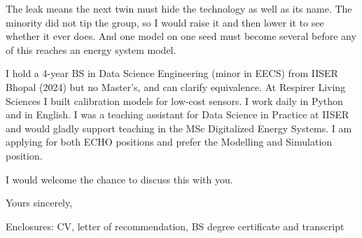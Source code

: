 \documentclass[11pt]{article}
\newcommand{\preference}{the Modelling and Simulation position}
\begin{document}
The leak means the next twin must hide the technology as well as its name. The minority did not tip the group, so I would raise it and then lower it to see whether it ever does. And one model on one seed must become several before any of this reaches an energy system model.

I hold a 4-year BS in Data Science Engineering (minor in EECS) from IISER Bhopal (2024) but no Master's, and can clarify equivalence. At Respirer Living Sciences I built calibration models for low-cost sensors. I work daily in Python and in English. I was a teaching assistant for Data Science in Practice at IISER and would gladly support teaching in the MSc Digitalized Energy Systems. I am applying for both ECHO positions and prefer \preference.

I would welcome the chance to discuss this with you.

Yours sincerely,\\[0.3em]
\myname

{\small\color{soft}Enclosures: CV, letter of recommendation, BS degree certificate and transcript}
\end{document}
